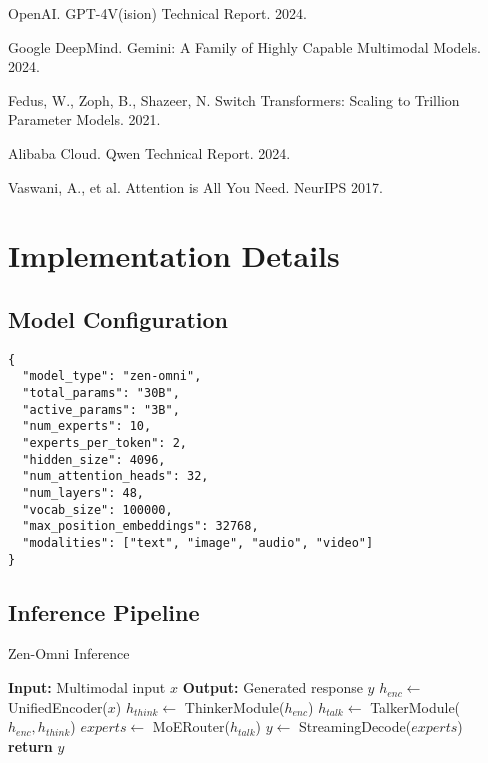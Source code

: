 \documentclass{article}
\begin{document}
\begin{thebibliography}{9}

OpenAI. GPT-4V(ision) Technical Report. 2024.

Google DeepMind. Gemini: A Family of Highly Capable Multimodal Models. 2024.

Fedus, W., Zoph, B., Shazeer, N. Switch Transformers: Scaling to Trillion Parameter Models. 2021.

Alibaba Cloud. Qwen Technical Report. 2024.

Vaswani, A., et al. Attention is All You Need. NeurIPS 2017.

\end{thebibliography}

\appendix

\section{Implementation Details}

\subsection{Model Configuration}

\begin{verbatim}
{
  "model_type": "zen-omni",
  "total_params": "30B",
  "active_params": "3B",
  "num_experts": 10,
  "experts_per_token": 2,
  "hidden_size": 4096,
  "num_attention_heads": 32,
  "num_layers": 48,
  "vocab_size": 100000,
  "max_position_embeddings": 32768,
  "modalities": ["text", "image", "audio", "video"]
}
\end{verbatim}

\subsection{Inference Pipeline}

\begin{algorithm}
\caption{Zen-Omni Inference}
\begin{algorithmic}
\STATE \textbf{Input:} Multimodal input $x$
\STATE \textbf{Output:} Generated response $y$
\STATE
\STATE $h_{enc} \leftarrow$ UnifiedEncoder($x$)
\STATE $h_{think} \leftarrow$ ThinkerModule($h_{enc}$)
\STATE $h_{talk} \leftarrow$ TalkerModule($h_{enc}, h_{think}$)
\STATE $experts \leftarrow$ MoERouter($h_{talk}$)
\STATE $y \leftarrow$ StreamingDecode($experts$)
\STATE \textbf{return} $y$
\end{algorithmic}
\end{algorithm}
\end{document}
